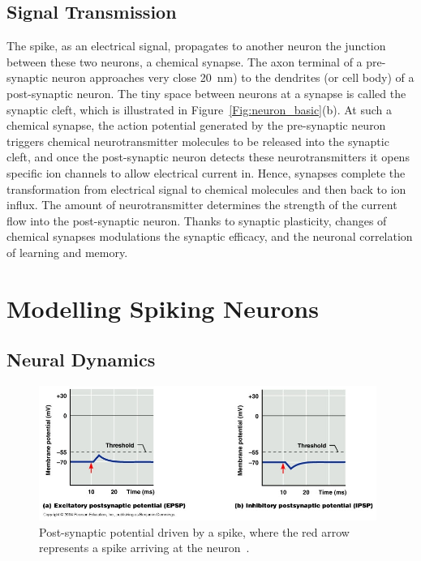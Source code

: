 \subsection{Signal Transmission}
\label{subsec:spike_trans}
The spike, as an electrical signal, propagates to another neuron \protect{} \protect{} the junction between these two neurons, a chemical synapse.
The axon terminal of a pre-synaptic neuron approaches very close \protect{} \protect{} 20~nm) to the dendrites (or cell body) of a  post-synaptic neuron.
The tiny space between neurons at a synapse is called the synaptic cleft, which is illustrated in Figure~\ref{Fig:neuron_basic}(b).
At such a chemical synapse, the action potential generated by the pre-synaptic neuron triggers chemical neurotransmitter molecules to be released into the synaptic cleft, and once the post-synaptic neuron detects these neurotransmitters it opens specific ion channels to allow electrical current in.
Hence, synapses complete the transformation from electrical signal to chemical molecules and then back to ion influx.
The amount of neurotransmitter determines the strength of the current flow into the post-synaptic neuron.
Thanks to synaptic plasticity, changes of chemical synapses \protect{} \protect{} modulations \protect{} \protect{} the synaptic efficacy, and \protect{} \protect{} the neuronal correlation of learning and memory.

\section{Modelling Spiking Neurons}
\label{sec:spike}

\subsection{Neural Dynamics}

\begin{figure}[tb!]
	\centering
	\includegraphics[width=0.98\textwidth]{pics_snn/EI_PSP.JPG}
	\caption{Post-synaptic potential driven by a spike, where the red arrow represents a spike arriving at the neuron~\citep{marieb2007human}.}
	\label{Fig:psp}
\end{figure}

